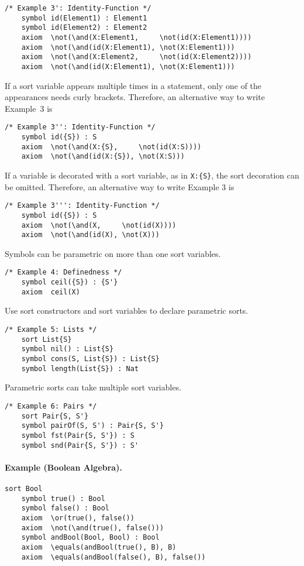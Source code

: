 \documentclass[UTF8,11pt]{article}
\theoremstyle{plain}
\theoremstyle{definition}
\theoremstyle{remark}
\begin{document}
\begin{Verbatim}[fontsize=\small]
    /* Example 3': Identity-Function */
    symbol id(Element1) : Element1
    symbol id(Element2) : Element2
    axiom  \not(\and(X:Element1,     \not(id(X:Element1))))
    axiom  \not(\and(id(X:Element1), \not(X:Element1)))
    axiom  \not(\and(X:Element2,     \not(id(X:Element2))))
    axiom  \not(\and(id(X:Element1), \not(X:Element1)))
\end{Verbatim}

If a sort variable appears multiple times in a statement, only one of the appearances needs curly brackets.
Therefore, an alternative way to write Example~3 is
\begin{Verbatim}[fontsize=\small]
    /* Example 3'': Identity-Function */
    symbol id({S}) : S
    axiom  \not(\and(X:{S},     \not(id(X:S))))
    axiom  \not(\and(id(X:{S}), \not(X:S)))
\end{Verbatim}

If a variable is decorated with a sort variable, as in {\small\verb|X:{S}|}, the sort decoration can be omitted. Therefore, an alternative way to write Example 3 is
\begin{Verbatim}[fontsize=\small]
    /* Example 3''': Identity-Function */
    symbol id({S}) : S
    axiom  \not(\and(X,     \not(id(X))))
    axiom  \not(\and(id(X), \not(X)))
\end{Verbatim}

Symbols can be parametric on more than one sort variables.
\begin{Verbatim}[fontsize=\small]
    /* Example 4: Definedness */
    symbol ceil({S}) : {S'}
    axiom  ceil(X)
\end{Verbatim}

Use sort constructors and sort variables to declare parametric sorts.
\begin{Verbatim}[fontsize=\small]
    /* Example 5: Lists */
    sort List{S}
    symbol nil() : List{S}
    symbol cons(S, List{S}) : List{S}
    symbol length(List{S}) : Nat
\end{Verbatim}

Parametric sorts can take multiple sort variables.
\begin{Verbatim}[fontsize=\small]
    /* Example 6: Pairs */
    sort Pair{S, S'}
    symbol pairOf(S, S') : Pair{S, S'}
    symbol fst(Pair{S, S'}) : S
    symbol snd(Pair{S, S'}) : S'  
\end{Verbatim}

\paragraph{Example (Boolean Algebra).}
\begin{Verbatim}[fontsize=\small]
    sort Bool
    symbol true() : Bool
    symbol false() : Bool
    axiom  \or(true(), false())
    axiom  \not(\and(true(), false()))
    symbol andBool(Bool, Bool) : Bool
    axiom  \equals(andBool(true(), B), B)
    axiom  \equals(andBool(false(), B), false())
\end{Verbatim}
\end{document}
